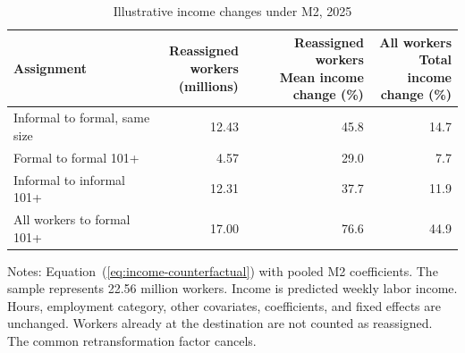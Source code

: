 \begin{table}[htbp]
\centering\small
\caption{Illustrative income changes under M2, 2025}
\label{tab:income-counterfactuals-2025}
\begin{tabular}{p{}rrr}
\toprule
Assignment & \shortstack{Reassigned\\workers\\(millions)} & \shortstack{Reassigned workers\\Mean income\\change (\%)} & \shortstack{All workers\\Total income\\change (\%)} \\
\midrule
Informal to formal, same size & 12.43 & 45.8 & 14.7 \\
Formal to formal 101+ & 4.57 & 29.0 & 7.7 \\
Informal to informal 101+ & 12.31 & 37.7 & 11.9 \\
\midrule
All workers to formal 101+ & 17.00 & 76.6 & 44.9 \\
\bottomrule
\end{tabular}
\par\vspace{0.3em}
\begin{minipage}{0.97\textwidth}\footnotesize
Notes: Equation~(\ref{eq:income-counterfactual}) with pooled M2 coefficients. The sample represents 22.56 million workers. Income is predicted weekly labor income. Hours, employment category, other covariates, coefficients, and fixed effects are unchanged. Workers already at the destination are not counted as reassigned. The common retransformation factor cancels.
\end{minipage}
\end{table}
